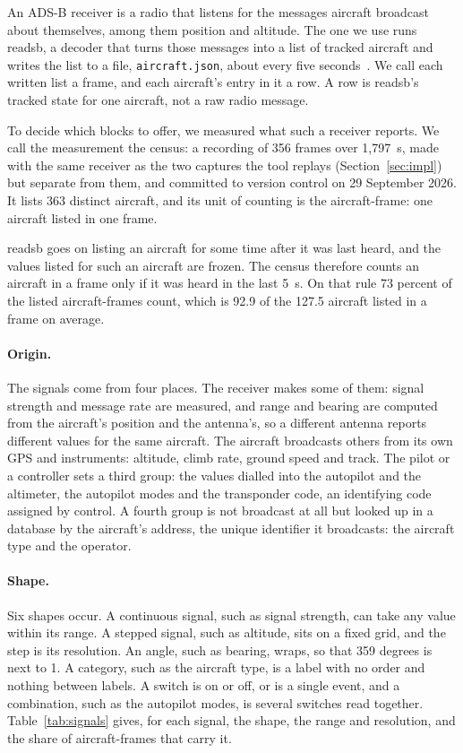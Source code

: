 \documentclass[11pt,letterpaper]{article}
\begin{document}
An ADS-B receiver is a radio that listens for the messages aircraft broadcast about themselves, among them position and altitude. The one we use runs readsb, a decoder that turns those messages into a list of tracked aircraft and writes the list to a file, \texttt{aircraft.json}, about every five seconds~\cite{wiedehopf2026readsb}. We call each written list a frame, and each aircraft's entry in it a row. A row is readsb's tracked state for one aircraft, not a raw radio message.

To decide which blocks to offer, we measured what such a receiver reports. We call the measurement the census: a recording of 356 frames over 1,797~s, made with the same receiver as the two captures the tool replays (Section~\ref{sec:impl}) but separate from them, and committed to version control on 29 September 2026. It lists 363 distinct aircraft, and its unit of counting is the aircraft-frame: one aircraft listed in one frame.

readsb goes on listing an aircraft for some time after it was last heard, and the values listed for such an aircraft are frozen. The census therefore counts an aircraft in a frame only if it was heard in the last 5~s. On that rule 73 percent of the listed aircraft-frames count, which is 92.9 of the 127.5 aircraft listed in a frame on average.

\paragraph{Origin.} The signals come from four places. The receiver makes some of them: signal strength and message rate are measured, and range and bearing are computed from the aircraft's position and the antenna's, so a different antenna reports different values for the same aircraft. The aircraft broadcasts others from its own GPS and instruments: altitude, climb rate, ground speed and track. The pilot or a controller sets a third group: the values dialled into the autopilot and the altimeter, the autopilot modes and the transponder code, an identifying code assigned by control. A fourth group is not broadcast at all but looked up in a database by the aircraft's address, the unique identifier it broadcasts: the aircraft type and the operator.

\paragraph{Shape.} Six shapes occur. A continuous signal, such as signal strength, can take any value within its range. A stepped signal, such as altitude, sits on a fixed grid, and the step is its resolution. An angle, such as bearing, wraps, so that 359 degrees is next to 1. A category, such as the aircraft type, is a label with no order and nothing between labels. A switch is on or off, or is a single event, and a combination, such as the autopilot modes, is several switches read together. Table~\ref{tab:signals} gives, for each signal, the shape, the range and resolution, and the share of aircraft-frames that carry it.
\end{document}

